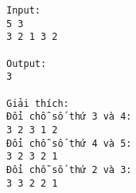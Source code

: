 \begin{verbatim}
Input:
5 3
3 2 1 3 2

Output:
3

Giải thích:
Đổi chỗ số thứ 3 và 4:
3 2 3 1 2
Đổi chỗ số thứ 4 và 5:
3 2 3 2 1
Đổi chỗ số thứ 2 và 3:
3 3 2 2 1
\end{verbatim}